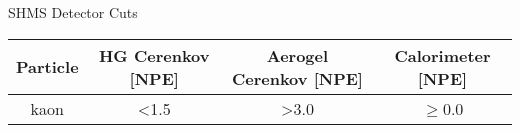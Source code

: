 \begin{Mtable}{SHMS Detector Cuts}
  \centering
  \begin{tabular}{|c|c|c|c|}
    \hline
    \textbf{Particle} & \textbf{HG Cerenkov [NPE]} & \textbf{Aerogel Cerenkov [NPE]} & \textbf{Calorimeter [NPE]} \\
    \hline    
    kaon & <1.5 & >3.0 & $\ge$0.0 \\
    \hline
  \end{tabular}
  \caption{}
  \label{tab:3-3_shms_cuts}
\end{Mtable}
